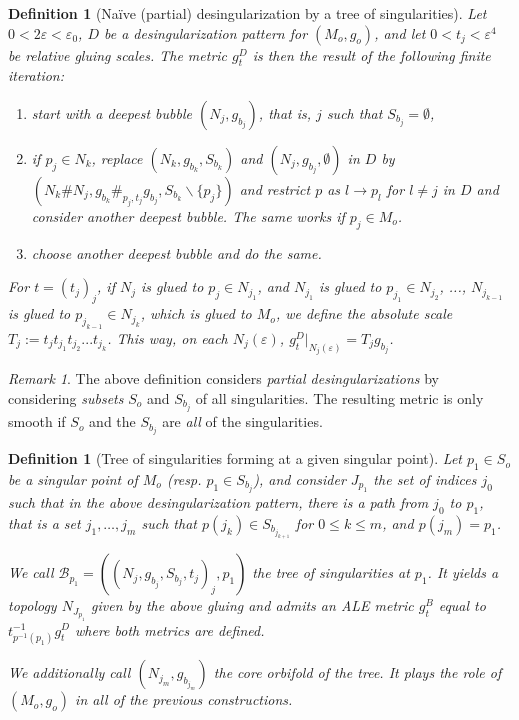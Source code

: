 \documentclass[11pt,reqno]{amsart}
\numberwithin{equation}{section}
\newtheorem{defn}[thm]{Definition}
\theoremstyle{definition}
\theoremstyle{remark}
\newtheorem{remark}[thm]{Remark}
\begin{document}
\begin{defn}[Naïve (partial) desingularization by a tree of singularities]\label{def total desing}
    Let $0<2\varepsilon<\varepsilon_0$, $D$ be a desingularization pattern for $(M_o,g_o)$, and let $0<t_j<\varepsilon^4$ be relative gluing scales. The metric $g^D_t$ is then the result of the following finite iteration: 
    \begin{enumerate}
        \item start with a deepest bubble $(N_j,g_{b_j})$, that is, $j$ such that $S_{b_j}= \emptyset$,
        \item if $p_j\in N_k$, replace $(N_k,g_{b_k},S_{b_k})$ and $(N_j,g_{b_j},\emptyset)$ in $D$ by $(N_k\#N_j,g_{b_k}\#_{p_j,t_j}g_{b_j},S_{b_k}\backslash\{p_j\})$ and restrict $p$ as $l\to p_l$ for $l\neq j$ in $D$ and consider another deepest bubble. The same works if $p_j\in M_o$.
        \item choose another deepest bubble and do the same.
    \end{enumerate}
    
    For $t = (t_j)_j$, if $N_j$ is glued to $p_j\in N_{j_1}$, and $N_{j_1}$ is glued to $p_{j_1}\in N_{j_2}$, ..., $N_{j_{k-1}}$ is glued to $p_{j_{k-1}}\in N_{j_k}$, which is glued to $M_o$, we define the absolute scale $T_j:= t_jt_{j_1}t_{j_2}...t_{j_k}$. This way, on each $N_j(\varepsilon)$,  $g^D_t|_{N_j(\varepsilon)}=T_jg_{b_j}$.
\end{defn}

\begin{remark}
    The above definition considers \textit{partial desingularizations} by considering \textit{subsets} $S_o$ and $S_{b_j}$ of all singularities. The resulting metric is only smooth if $S_o$ and the $S_{b_j}$ are \textit{all} of the singularities.
\end{remark}

\begin{defn}[Tree of singularities forming at a given singular point]\label{def:tree of sing at po}
    Let $p_1\in S_o$ be a singular point of $M_o$ (resp. $p_1\in S_{b_j}$), and consider $J_{p_1}$ the set of indices $j_0$ such that in the above desingularization pattern, there is a \textit{path} from $j_0$ to $p_1$, that is a set $j_1,\dots,j_{m}$ such that $p(j_k)\in S_{b_{j_{k+1}}}$ for $0\leqslant k\leqslant m$, and $p(j_m)=p_1$. 
    
    We call $\mathcal{B}_{p_1} = \left((N_j,g_{b_j},S_{b_j},t_j)_j,p_1\right)$ the \emph{tree of singularities} at $p_1$. It yields a topology $N_{J_{p_1}}$ given by the above gluing and admits an ALE metric $g^B_{t}$ equal to $t^{-1}_{p^{-1}(p_1)}g^D_{t}$ where both metrics are defined.

    We additionally call $(N_{j_m},g_{b_{j_m}})$ the core orbifold of the tree. It plays the role of $(M_o,g_o)$ in all of the previous constructions.
\end{defn}
\end{document}
